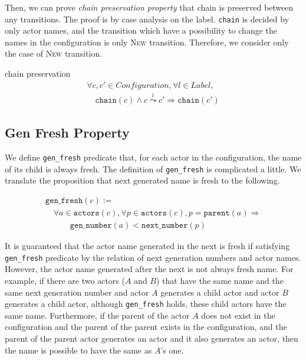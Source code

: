 Then, we can prove \textit{chain preservation property} that chain is preserved between any transitions.
The proof is by case analysis on the label.
\texttt{chain} is decided by only actor names, and the transition which have a possibility to change the names in the configuration is only \textsc{New} transition.
Therefore, we consider only the case of \textsc{New} transition.

\begin{lemma}{chain preservation}
\begin{displaymath}
  \begin{array}{l}
    \forall c, c' \in \textit{Configuration}, \forall l \in \textit{Label}, \\
    \quad \texttt{chain}(c) \wedge c \overset{l}{\leadsto} c' \Rightarrow \texttt{chain}(c')
  \end{array}
\end{displaymath}
\end{lemma}

\subsection{Gen Fresh Property}
We define \texttt{gen\_fresh} predicate that, for each actor in the configuration, the name of its child is always fresh.
The definition of \texttt{gen\_fresh} is complicated a little.
We translate the proposition that next generated name is fresh to the following.

\begin{displaymath}
  \begin{array}{l}
    \texttt{gen\_fresh}(c) := \\
    \quad \forall a \in \texttt{actors}(c), \forall p \in \texttt{actors}(c), p = \texttt{parent}(a) \Rightarrow \\
    \quad \quad \quad \texttt{gen\_number}(a) < \texttt{next\_number}(p)
  \end{array}
\end{displaymath}


It is guaranteed that the actor name generated in the next is fresh if satisfying \texttt{gen\_fresh} predicate by the relation of next generation numbers and actor names. %
However, the actor name generated after the next is not always fresh name.
For example, if there are two actors ($A$ and $B$) that have the same name and the same next generation number and actor $A$ generates a child actor and actor $B$ generates a child actor, although \texttt{gen\_fresh} holds, these child actors have the same name.
Furthermore, if the parent of the actor $A$ does not exist in the configuration and the parent of the parent exists in the configuration, and the parent of the parent actor generates an actor and it also generates an actor, then the name is possible to have the same as $A$'s one.

